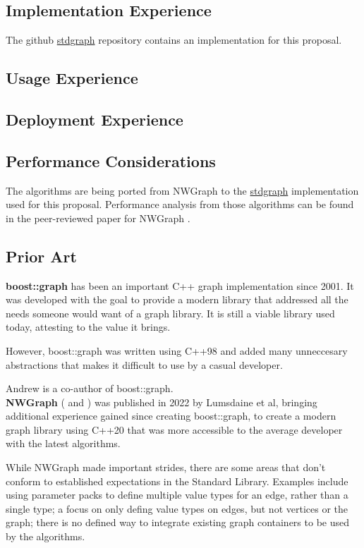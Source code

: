 \documentclass[10pt,onecolumn]{article}
\begin{document}
\subsection{Implementation Experience}
The github \href{https://github.com/stdgraph}{stdgraph} repository contains an implementation for this proposal.

\subsection{Usage Experience}
\subsection{Deployment Experience}
\subsection{Performance Considerations}
The algorithms are being ported from NWGraph to the \href{https://github.com/stdgraph}{stdgraph} implementation used for this proposal. Performance analysis from those algorithms can be found in the peer-reviewed paper for NWGraph \cite{REF_nwgraph_paper}.

\subsection{Prior Art}
\textbf{boost::graph} has been an important C++ graph implementation since 2001. It was developed with the goal to provide
a modern library that addressed all the needs someone would want of a graph library. It is still a viable library used today,
attesting to the value it brings.

However, boost::graph was written using C++98 and added many unneccesary abstractions that makes it difficult
to use by a casual developer. 

Andrew is a co-author of boost::graph.
\\

\textbf{NWGraph} (\cite{REF_nwgraph_library} and \cite{REF_nwgraph_paper}) was published in 2022
by Lumsdaine et al, bringing additional experience gained since creating boost::graph, to create a modern graph library using C++20 that
was more accessible to the average developer with the latest algorithms.

While NWGraph made
important strides, there are some areas that don't conform to established expectations in the Standard Library. Examples
include using parameter packs to define multiple value types for an edge, rather than a single type; a focus on only defing value types on edges, but not vertices or the graph; there is no defined way to
integrate existing graph containers to be used by the algorithms.
\\
\end{document}
